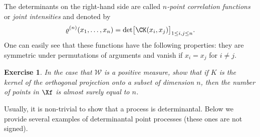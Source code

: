 \documentclass[]{pcmi}
\theoremstyle{plain}
\newtheorem{exercise}[equation]{Exercise}
\theoremstyle{definition}
\begin{document}
\noindent The determinants on the right-hand side are called \emph{$n$-point correlation functions} or \emph{joint intensities} and denoted by
\begin{equation}\label{eq:corr}
	\varrho^{(n)}(x_1,\ldots,x_n) = \det \bigl[\CK(x_i,x_j)\bigr]_{1 \leq i,j \leq n}.
\end{equation}
One can easily see that these functions have the following properties: they are symmetric under permutations of arguments and vanish if $x_i = x_j$ for $i \neq j$.

\begin{exercise}  
In the case that $\mathcal{W}$ is a positive measure,  show that if $K$ is the kernel of the orthogonal projection onto a subset of dimension $n$, then the number of points in $\Xf$ is almost surely equal to $n$.
\end{exercise}
 
Usually, it is non-trivial to show that a process is determinantal. Below we provide several examples of determinantal point processes
(these ones are not signed).
\end{document}
